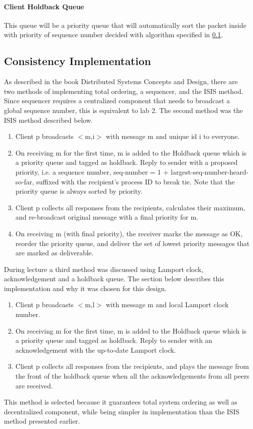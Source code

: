 \paragraph*{Client Holdback Queue}

This queue will be a priority queue that will automatically sort the packet inside with priority of sequence number decided with algorithm specified in \ref{ImplConsistency}.

\subsection{Consistency Implementation}\label{ImplConsistency}

As described in the book Distributed Systems Concepts and Design, there are two methods of implementing total ordering, a sequencer, and the ISIS method. Since sequencer requires a centralized component that needs to broadcast a global sequence number, this is equivalent to lab 2. The second method was the ISIS method described below.

\begin{enumerate}
\item Client p broadcasts $<$m,i$>$  with message m and unique id i to everyone.
 
\item On receiving m for the first time, m is added to the Holdback queue which is a priority queue and tagged as holdback. Reply to sender with a proposed priority, i.e. a sequence number, seq-number = 1 + largest-seq-number-heard-so-far, suffixed with the recipient’s process ID to break tie. Note that the priority queue is always sorted by priority.

\item Client p collects all responses from the recipients, calculates their maximum, and re-broadcast original message with a final priority for m. 

\item On receiving m (with final priority), the receiver marks the message as OK, reorder the priority queue, and deliver the set of lowest priority messages that are marked as deliverable.
\end{enumerate}

During lecture a third method was discussed using Lamport clock, acknowledgement and a holdback queue. The section below describes this implementation and why it was chosen for this design.

\begin{enumerate}
\item Client p broadcasts  $<$m,l$>$  with message m and local Lamport clock number.
 
\item On receiving m for the first time, m is added to the Holdback queue which is a priority queue and tagged as holdback. Reply to sender with an acknowledgement with the up-to-date Lamport clock.

\item Client p collects all responses from the recipients, and plays the message from the front of the holdback queue when all the acknowledgements from all peers are received.
\end{enumerate}

This method is selected because it guarantees total system ordering as well as decentralized component, while being simpler in implementation than the ISIS method presented earlier.

